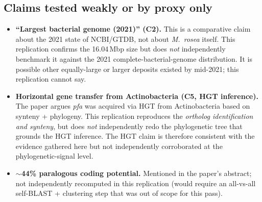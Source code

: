 \documentclass[11pt,a4paper]{article}
\begin{document}
\subsection{Claims tested weakly or by proxy only}
\begin{itemize}[leftmargin=1.2cm]
\item \textbf{``Largest bacterial genome (2021)'' (C2).} This is a comparative claim about the 2021 state of NCBI/GTDB, not about \textit{M.\ rosea} itself. This replication confirms the 16.04\,Mbp size but does \emph{not} independently benchmark it against the 2021 complete-bacterial-genome distribution. It is possible other equally-large or larger deposits existed by mid-2021; this replication cannot say.
\item \textbf{Horizontal gene transfer from Actinobacteria (C5, HGT inference).} The paper argues \textit{pfa} was acquired via HGT from Actinobacteria based on synteny + phylogeny. This replication reproduces the \emph{ortholog identification and synteny}, but does \emph{not} independently redo the phylogenetic tree that grounds the HGT inference. The HGT claim is therefore consistent with the evidence gathered here but not independently corroborated at the phylogenetic-signal level.
\item \textbf{$\sim$44\% paralogous coding potential.} Mentioned in the paper's abstract; not independently recomputed in this replication (would require an all-vs-all self-BLAST + clustering step that was out of scope for this pass).
\end{itemize}
\end{document}
